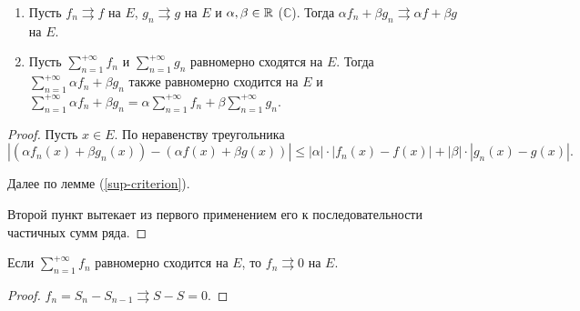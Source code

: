 \begin{property}[линейность]
    \begin{enumerate}
        \item Пусть $f_n \rightrightarrows f$ на $E$, $g_n \rightrightarrows g$ на $E$ и $\alpha, \beta \in \mathbb{R}$ ($\mathbb{C}$). Тогда $\alpha f_n + \beta g_n \rightrightarrows \alpha f + \beta g$ на $E$.

        \item Пусть $\sum_{n = 1}^{+\infty} f_n$ и $\sum_{n = 1}^{+\infty} g_n$ равномерно сходятся на $E$. Тогда $\sum_{n = 1}^{+\infty} \alpha f_n + \beta g_n$ также равномерно сходится на $E$ и $\sum_{n = 1}^{+\infty} \alpha f_n + \beta g_n = \alpha \sum_{n = 1}^{+\infty} f_n + \beta \sum_{n = 1}^{+\infty} g_n$.
    \end{enumerate}

    \begin{proof}
        Пусть $x \in E$. По неравенству треугольника
        \[
            |(\alpha f_n(x) + \beta g_n(x)) - (\alpha f(x) + \beta g(x))| \le |\alpha| \cdot |f_n(x) - f(x)| + |\beta| \cdot |g_n(x) - g(x)|.
        \]

        Далее по лемме (\ref{sup-criterion}).

        Второй пункт вытекает из первого применением его к последовательности частичных сумм ряда.
    \end{proof}
\end{property}

\begin{corollary}
    Если $\sum_{n = 1}^{+\infty} f_n$ равномерно сходится на $E$, то $f_n \rightrightarrows 0$ на $E$.

    \begin{proof}
        $f_n = S_n - S_{n - 1} \rightrightarrows S - S = 0$.
    \end{proof}
\end{corollary}

